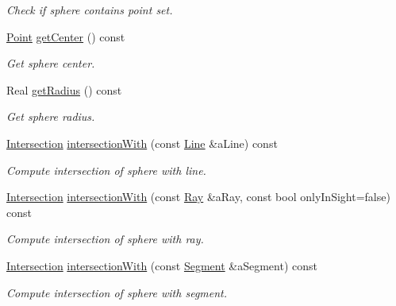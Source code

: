 \begin{DoxyCompactItemize}
\begin{DoxyCompactList}\small\item\em Check if sphere contains point set. \end{DoxyCompactList}\item 
\hyperlink{classostk_1_1math_1_1geom_1_1d3_1_1objects_1_1_point}{Point} \hyperlink{classostk_1_1math_1_1geom_1_1d3_1_1objects_1_1_sphere_aa99591327b0fe9aac8f03dc34b41207a}{get\+Center} () const
\begin{DoxyCompactList}\small\item\em Get sphere center. \end{DoxyCompactList}\item 
Real \hyperlink{classostk_1_1math_1_1geom_1_1d3_1_1objects_1_1_sphere_a856d4bceb6c0e3133aced9eab57d6450}{get\+Radius} () const
\begin{DoxyCompactList}\small\item\em Get sphere radius. \end{DoxyCompactList}\item 
\hyperlink{classostk_1_1math_1_1geom_1_1d3_1_1_intersection}{Intersection} \hyperlink{classostk_1_1math_1_1geom_1_1d3_1_1objects_1_1_sphere_afbae10b116900f5383913e564c0ec91a}{intersection\+With} (const \hyperlink{classostk_1_1math_1_1geom_1_1d3_1_1objects_1_1_line}{Line} \&a\+Line) const
\begin{DoxyCompactList}\small\item\em Compute intersection of sphere with line. \end{DoxyCompactList}\item 
\hyperlink{classostk_1_1math_1_1geom_1_1d3_1_1_intersection}{Intersection} \hyperlink{classostk_1_1math_1_1geom_1_1d3_1_1objects_1_1_sphere_a8980be0640bcfb44f61b913f904c89a2}{intersection\+With} (const \hyperlink{classostk_1_1math_1_1geom_1_1d3_1_1objects_1_1_ray}{Ray} \&a\+Ray, const bool only\+In\+Sight=false) const
\begin{DoxyCompactList}\small\item\em Compute intersection of sphere with ray. \end{DoxyCompactList}\item 
\hyperlink{classostk_1_1math_1_1geom_1_1d3_1_1_intersection}{Intersection} \hyperlink{classostk_1_1math_1_1geom_1_1d3_1_1objects_1_1_sphere_a90b0be4e76f556042518b92fd29f0edf}{intersection\+With} (const \hyperlink{classostk_1_1math_1_1geom_1_1d3_1_1objects_1_1_segment}{Segment} \&a\+Segment) const
\begin{DoxyCompactList}\small\item\em Compute intersection of sphere with segment. \end{DoxyCompactList}\item 

\end{DoxyCompactItemize}
